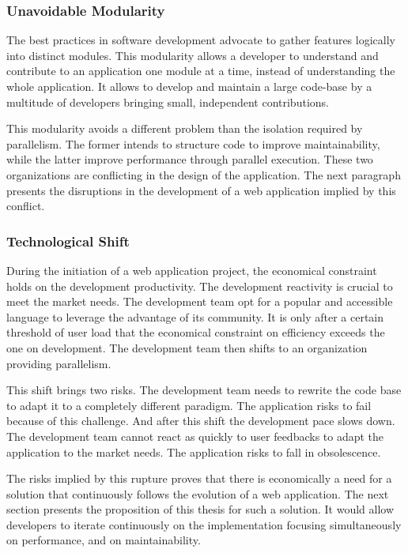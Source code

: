 \subsubsection{Unavoidable Modularity}

The best practices in software development advocate to gather features logically into distinct modules.
This modularity allows a developer to understand and contribute to an application one module at a time, instead of understanding the whole application.
It allows to develop and maintain a large code-base by a multitude of developers bringing small, independent contributions.

This modularity avoids a different problem than the isolation required by parallelism.
The former intends to structure code to improve maintainability, while the latter improve performance through parallel execution.
These two organizations are conflicting in the design of the application.
The next paragraph presents the disruptions in the development of a web application implied by this conflict.

\subsubsection{Technological Shift}

During the initiation of a web application project, the economical constraint holds on the development productivity.
The development reactivity is crucial to meet the market needs.
The development team opt for a popular and accessible language to leverage the advantage of its community.
It is only after a certain threshold of user load that the economical constraint on efficiency exceeds the one on development.
The development team then shifts to an organization providing parallelism.

This shift brings two risks.
The development team needs to rewrite the code base to adapt it to a completely different paradigm.
The application risks to fail because of this challenge.
And after this shift the development pace slows down.
The development team cannot react as quickly to user feedbacks to adapt the application to the market needs.
The application risks to fall in obsolescence.

The risks implied by this rupture proves that there is economically a need for a solution that continuously follows the evolution of a web application.
The next section presents the proposition of this thesis for such a solution.
It would allow developers to iterate continuously on the implementation focusing simultaneously on performance, and on maintainability.

